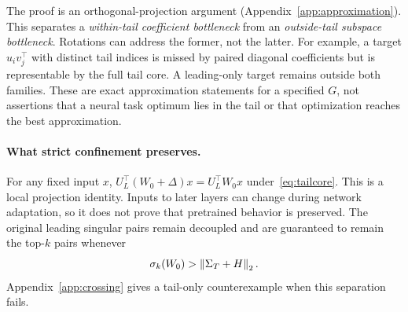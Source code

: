 The proof is an orthogonal-projection argument (Appendix~\ref{app:approximation}). This separates a \emph{within-tail coefficient bottleneck} from an \emph{outside-tail subspace bottleneck}. Rotations can address the former, not the latter. For example, a target $u_i v_j^\top$ with distinct tail indices is missed by paired diagonal coefficients but is representable by the full tail core. A leading-only target remains outside both families. These are exact approximation statements for a specified $G$, not assertions that a neural task optimum lies in the tail or that optimization reaches the best approximation.

\paragraph{What strict confinement preserves.}
For any fixed input $x$, $U_L^\top(W_0+\Delta)x=U_L^\top W_0x$ under~\eqref{eq:tailcore}. This is a local projection identity. Inputs to later layers can change during network adaptation, so it does not prove that pretrained behavior is preserved. The original leading singular pairs remain decoupled and are guaranteed to remain the top-$k$ pairs whenever
\begin{equation}
\sigma_k(W_0)>\left\|\Sigma_T+H\right\|_2.
\label{eq:nocrossing}
\end{equation}
Appendix~\ref{app:crossing} gives a tail-only counterexample when this separation fails.
